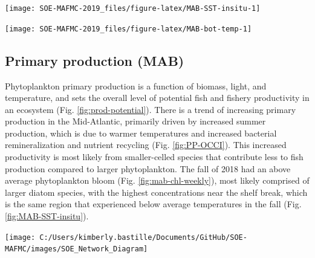 \documentclass[10pt,]{article}
\let\origfigure\figure
\let\endorigfigure\endfigure
\renewenvironment{figure}[1][2] {
    \expandafter\origfigure\expandafter[H]
} {
    \endorigfigure
}
\begin{document}
\begin{figure}

{\centering \texttt{[image: SOE-MAFMC-2019\_files/figure-latex/MAB-SST-insitu-1]} 

}

\caption{MAB seasonal sea surface time series overlaid onto 2018 seasonal spatial anomalies.}\label{fig:MAB-SST-insitu}
\end{figure}

\begin{figure}

{\centering \texttt{[image: SOE-MAFMC-2019\_files/figure-latex/MAB-bot-temp-1]} 

}

\caption{Annual bottom temperatures in the Mid-Atlantic Bight.}\label{fig:MAB-bot-temp}
\end{figure}

\subsection{Primary production (MAB)}\label{primary-production-mab}

Phytoplankton primary production is a function of biomass, light, and
temperature, and sets the overall level of potential fish and fishery
productivity in an ecosystem (Fig. \ref{fig:prod-potential}). There is a
trend of increasing primary production in the Mid-Atlantic, primarily
driven by increased summer production, which is due to warmer
temperatures and increased bacterial remineralization and nutrient
recycling (Fig. \ref{fig:PP-OCCI}). This increased productivity is most
likely from smaller-celled species that contribute less to fish
production compared to larger phytoplankton. The fall of 2018 had an
above average phytoplankton bloom (Fig. \ref{fig:mab-chl-weekly}), most
likely comprised of larger diatom species, with the highest
concentrations near the shelf break, which is the same region that
experienced below average temperatures in the fall (Fig.
\ref{fig:MAB-SST-insitu}).

\begin{figure}

{\centering \texttt{[image: C:/Users/kimberly.bastille/Documents/GitHub/SOE-MAFMC/images/SOE\_Network\_Diagram]} 

}

\caption{Simplified representation of the pathways linking primary production and environmental driver throughout a fishery ecosystem. The important societal benefits that derive from sustainable fisheries depend directly on a sequence of events starting at the base of the food web. The production of fish and shellfish available for harvest by the fisheries follows pathways of energy flow from phytoplankton and zooplankton to different parts of the food web. The production at each component further depends on the effect of a host of environmental drivers including temperature, salinity, and other factors.}\label{fig:prod-potential}
\end{figure}
\end{document}
